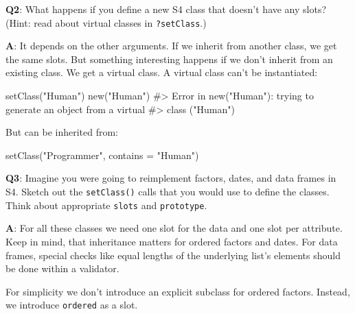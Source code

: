 \documentclass[
]{krantz}
\makeatletter
\newenvironment{Shaded}{\begin{snugshade}}{\end{snugshade}}
\newcommand{\CommentTok}[1]{\textcolor[rgb]{0.56,0.35,0.01}{\textit{#1}}}
\newcommand{\DataTypeTok}[1]{\textcolor[rgb]{0.13,0.29,0.53}{#1}}
\newcommand{\KeywordTok}[1]{\textcolor[rgb]{0.13,0.29,0.53}{\textbf{#1}}}
\newcommand{\NormalTok}[1]{#1}
\newcommand{\StringTok}[1]{\textcolor[rgb]{0.31,0.60,0.02}{#1}}
\newenvironment{kframe}{%
\medskip{}
\setlength{\fboxsep}{.8em}
 \def\at@end@of@kframe{}%
 \ifinner\ifhmode%
  \def\at@end@of@kframe{\end{minipage}}%
  \begin{minipage}{\columnwidth}%
 \fi\fi%
 \def\FrameCommand##1{\hskip\@totalleftmargin \hskip-\fboxsep
 \colorbox{shadecolor}{##1}\hskip-\fboxsep
     \hskip-\linewidth \hskip-\@totalleftmargin \hskip\columnwidth}%
 \MakeFramed {\advance\hsize-\width
   \@totalleftmargin\z@ \linewidth\hsize
   \@setminipage}}%
 {\par\unskip\endMakeFramed%
 \at@end@of@kframe}
\renewenvironment{Shaded}{\begin{kframe}}{\end{kframe}}
\renewcommand{\KeywordTok} [1]{\textcolor[rgb]{0.00,0.44,0.13}{{#1}}}
\renewcommand{\DataTypeTok}[1]{\textcolor[rgb]{0.56,0.13,0.00}{{#1}}}
\renewcommand{\StringTok}  [1]{\textcolor[rgb]{0.25,0.44,0.63}{{#1}}}
\renewcommand{\CommentTok} [1]{\textcolor[rgb]{0.38,0.63,0.69}{{#1}}}
\renewcommand{\NormalTok}  [1]{{#1}}
\makeatother
\begin{document}
\textbf{{Q2}}: What happens if you define a new S4 class that doesn't have any slots? (Hint: read about virtual classes in \texttt{?setClass}.)

\textbf{{A}}: It depends on the other arguments. If we inherit from another class, we get the same slots. But something interesting happens if we don't inherit from an existing class. We get a virtual class. A virtual class can't be instantiated:

\begin{Shaded}
\begin{Highlighting}[]
\KeywordTok{setClass}\NormalTok{(}\StringTok{"Human"}\NormalTok{)}
\KeywordTok{new}\NormalTok{(}\StringTok{"Human"}\NormalTok{)}
\CommentTok{#> Error in new("Human"): trying to generate an object from a virtual}
\CommentTok{#> class ("Human")}
\end{Highlighting}
\end{Shaded}

But can be inherited from:

\begin{Shaded}
\begin{Highlighting}[]
\KeywordTok{setClass}\NormalTok{(}\StringTok{"Programmer"}\NormalTok{, }\DataTypeTok{contains =} \StringTok{"Human"}\NormalTok{)}
\end{Highlighting}
\end{Shaded}

\textbf{{Q3}}: Imagine you were going to reimplement factors, dates, and data frames in S4. Sketch out the \texttt{setClass()} calls that you would use to define the classes. Think about appropriate \texttt{slots} and \texttt{prototype}.

\textbf{{A}}: For all these classes we need one slot for the data and one slot per attribute. Keep in mind, that inheritance matters for ordered factors and dates. For data frames, special checks like equal lengths of the underlying list's elements should be done within a validator.

For simplicity we don't introduce an explicit subclass for ordered factors. Instead, we introduce \texttt{ordered} as a slot.
\end{document}
